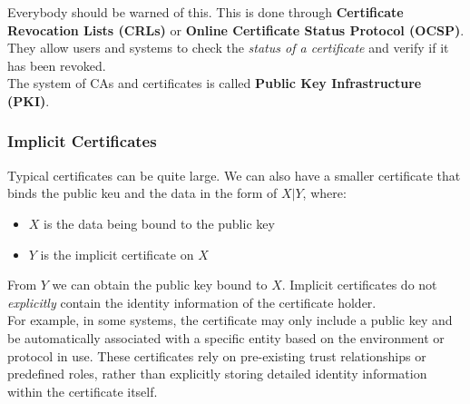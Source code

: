 Everybody should be warned of this. This is done through \textbf{Certificate Revocation Lists (CRLs)} or \textbf{Online Certificate Status Protocol (OCSP)}.
They allow users and systems to check the \emph{status of a certificate} and verify if it has been revoked. \\

The system of CAs and certificates is called \textbf{Public Key Infrastructure (PKI)}.

\subsubsection{Implicit Certificates}
Typical certificates can be quite large. We can also have a smaller certificate that binds the 
public keu and the data in the form of $X|Y$, where:

\begin{itemize}
    \item $X$ is the data being bound to the public key
    \item $Y$ is the implicit certificate on $X$
\end{itemize}

From $Y$ we can obtain the public key bound to $X$. Implicit certificates do not \emph{explicitly} contain the identity
information of the certificate holder.\\

For example, in some systems, the certificate may only include a public key and be automatically associated with a specific entity based
on the environment or protocol in use. These certificates rely on pre-existing trust relationships or predefined roles,  
rather than explicitly storing detailed identity information within the certificate itself. \\


